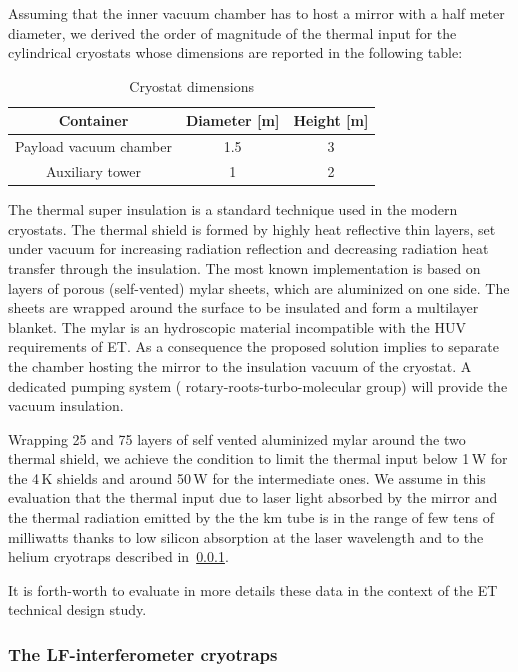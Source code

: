 \noindent
Assuming  that the inner vacuum chamber has to host a mirror with a half meter diameter, we derived the order of magnitude of the thermal input  for the cylindrical cryostats whose dimensions are reported  in the following table:
\begin{table}[htdp]
\caption{Cryostat dimensions}
\begin{center}
\begin{tabular}{|c|c|c|}
\hline
\hline
 Container & Diameter [m] & Height [m]\\
\hline
Payload vacuum chamber & 1.5 & 3  \\
Auxiliary tower  & 1 & 2 \\
\hline
\hline
\end{tabular}
\end{center}
\label{tab:cryostat_dimension}
\end{table}

 The thermal super insulation is a standard technique used in the modern cryostats.  The thermal  shield is formed by  highly heat reflective thin layers, set under vacuum  for increasing radiation reflection and decreasing radiation heat transfer through the insulation.  The  most known  implementation   is based on layers  of porous (self-vented) mylar  sheets, which are  aluminized on one side. The sheets are wrapped around the surface to be insulated and  form  a multilayer blanket. 
The mylar is an hydroscopic material incompatible with the HUV requirements of ET. As a consequence the proposed solution implies to  separate the chamber hosting the mirror to the insulation vacuum of the cryostat.   A dedicated pumping system ( rotary-roots-turbo-molecular group) will provide the vacuum insulation.  

Wrapping  25 and 75 layers of self vented aluminized mylar around the two thermal shield, we achieve   the condition to limit the thermal input 
below 1\,W for the 4\,K shields and  around  50\,W for the intermediate ones.
We assume in this evaluation  that the thermal input due to laser light absorbed by the mirror and the thermal radiation emitted by the the km tube is   in the range of few tens of milliwatts  thanks to low silicon absorption at the laser wavelength and to  the helium cryotraps described in~\ref{subsection_helium_cryotraps}. 

It is forth-worth to  evaluate in more details these data in the context of the ET technical design study.  
\FloatBarrier
\subsubsection{The LF-interferometer cryotraps}
\label {subsection_helium_cryotraps}


